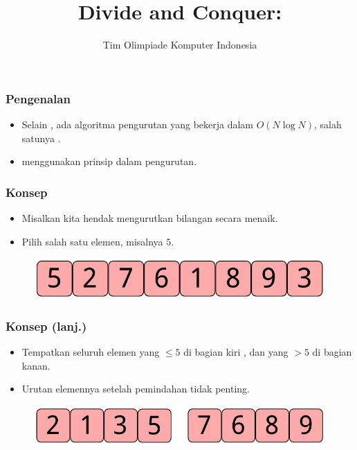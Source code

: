 

\title{Divide and Conquer:\newline \fQuickSort}
\author{Tim Olimpiade Komputer Indonesia}
\date{}



\begin{frame}
\titlepage
\end{frame}

\begin{frame}
\frametitle{Pengenalan}
\begin{itemize}
  \item Selain \fmergeSort, ada algoritma pengurutan yang bekerja dalam $O(N \log{N})$, salah satunya \newTerm{\fquickSort}.
  \item \fQuickSort menggunakan prinsip \fdivideAndConquer dalam pengurutan.
\end{itemize}
\end{frame}

\begin{frame}
\frametitle{Konsep}
\begin{itemize}
  \item Misalkan kita hendak mengurutkan \farray bilangan secara menaik.
  \item Pilih salah satu elemen, misalnya $5$.
\end{itemize}
\begin{figure}
  \centering
  \includegraphics[width=7 cm]{asset/quicksort-concept-1.pdf}
\end{figure}
\end{frame}

\begin{frame}
\frametitle{Konsep (lanj.)}
\begin{itemize}
  \item Tempatkan seluruh elemen yang $\leq 5$ di bagian kiri \farray, dan yang $> 5$ di bagian kanan.
  \item Urutan elemennya setelah pemindahan tidak penting.
\end{itemize}
\begin{figure}
  \centering
  \includegraphics[width=7 cm]{asset/quicksort-concept-2.pdf}
\end{figure}
\end{frame}


